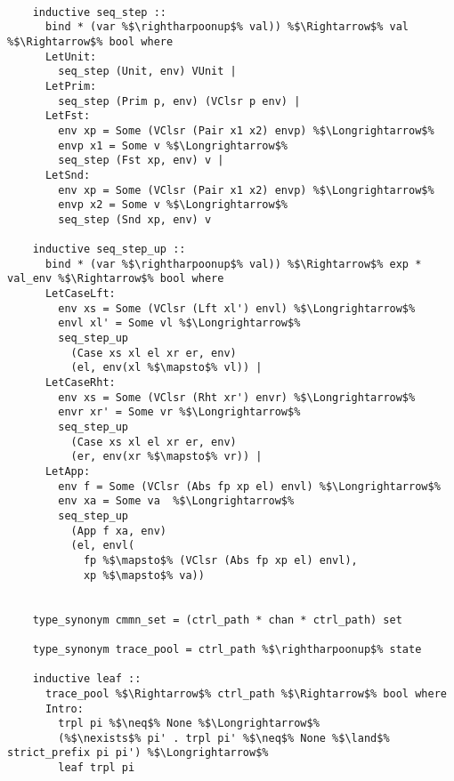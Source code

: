 \documentclass{article}
\begin{document}
  \begin{lstlisting}[style=codestyle1, escapechar=\%]

    inductive seq_step ::
      bind * (var %$\rightharpoonup$% val)) %$\Rightarrow$% val %$\Rightarrow$% bool where
      LetUnit: 
        seq_step (Unit, env) VUnit |
      LetPrim:
        seq_step (Prim p, env) (VClsr p env) |
      LetFst:
        env xp = Some (VClsr (Pair x1 x2) envp) %$\Longrightarrow$%
        envp x1 = Some v %$\Longrightarrow$% 
        seq_step (Fst xp, env) v |
      LetSnd: 
        env xp = Some (VClsr (Pair x1 x2) envp) %$\Longrightarrow$%  
        envp x2 = Some v %$\Longrightarrow$% 
        seq_step (Snd xp, env) v

    inductive seq_step_up ::
      bind * (var %$\rightharpoonup$% val)) %$\Rightarrow$% exp * val_env %$\Rightarrow$% bool where 
      LetCaseLft:
        env xs = Some (VClsr (Lft xl') envl) %$\Longrightarrow$%
        envl xl' = Some vl %$\Longrightarrow$%
        seq_step_up
          (Case xs xl el xr er, env)
          (el, env(xl %$\mapsto$% vl)) |
      LetCaseRht: 
        env xs = Some (VClsr (Rht xr') envr) %$\Longrightarrow$% 
        envr xr' = Some vr %$\Longrightarrow$%
        seq_step_up
          (Case xs xl el xr er, env)
          (er, env(xr %$\mapsto$% vr)) |
      LetApp:
        env f = Some (VClsr (Abs fp xp el) envl) %$\Longrightarrow$% 
        env xa = Some va  %$\Longrightarrow$% 
        seq_step_up
          (App f xa, env)
          (el, envl(
            fp %$\mapsto$% (VClsr (Abs fp xp el) envl),
            xp %$\mapsto$% va))


    type_synonym cmmn_set = (ctrl_path * chan * ctrl_path) set

    type_synonym trace_pool = ctrl_path %$\rightharpoonup$% state

    inductive leaf ::
      trace_pool %$\Rightarrow$% ctrl_path %$\Rightarrow$% bool where
      Intro:
        trpl pi %$\neq$% None %$\Longrightarrow$% 
        (%$\nexists$% pi' . trpl pi' %$\neq$% None %$\land$% strict_prefix pi pi') %$\Longrightarrow$%  
        leaf trpl pi


\end{lstlisting}
\end{document}
